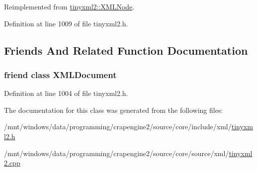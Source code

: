 Reimplemented from \hyperlink{classtinyxml2_1_1_x_m_l_node_a71f5ae90296dbe67979f83fe97073efa}{tinyxml2\+::\+X\+M\+L\+Node}.



Definition at line 1009 of file tinyxml2.\+h.



\subsection{Friends And Related Function Documentation}
\hypertarget{classtinyxml2_1_1_x_m_l_unknown_a4eee3bda60c60a30e4e8cd4ea91c4c6e}{
\subsubsection[{X\+M\+L\+Document}]{\setlength{\rightskip}{0pt plus 5cm}friend class {\bf X\+M\+L\+Document}\hspace{0.3cm}{\ttfamily [friend]}}}\label{classtinyxml2_1_1_x_m_l_unknown_a4eee3bda60c60a30e4e8cd4ea91c4c6e}


Definition at line 1004 of file tinyxml2.\+h.



The documentation for this class was generated from the following files\+:\begin{DoxyCompactItemize}
\item 
/mnt/windows/data/programming/crapengine2/source/core/include/xml/\hyperlink{tinyxml2_8h}{tinyxml2.\+h}\item 
/mnt/windows/data/programming/crapengine2/source/core/source/xml/\hyperlink{tinyxml2_8cpp}{tinyxml2.\+cpp}\end{DoxyCompactItemize}
